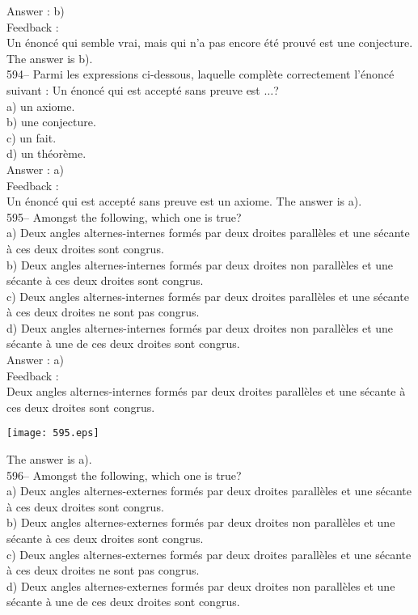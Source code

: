 ﻿\documentclass[letterpaper, 12pt]{article}
\begin{document}
Answer : b)\\

Feedback : \\
Un \'enonc\'e qui semble vrai, mais qui n'a pas encore \'et\'e prouv\'e est
une conjecture.  The answer is b).\\

594-- Parmi les expressions ci-dessous, laquelle compl\`ete
correctement l'\'enonc\'e suivant : \og Un \'enonc\'e qui est
 accept\'e sans preuve est $\ldots$\fg ?\\
a) un axiome.\\
b) une conjecture.\\
c) un fait.\\
d) un th\'eor\`eme.\\

Answer : a)\\

Feedback : \\
Un \'enonc\'e qui est accept\'e sans preuve est un
axiome.  The answer is a).  \\

595-- Amongst the following, which one is true?\\
a) Deux angles alternes-internes form\'es par deux droites parall\`eles et
une s\'ecante \`a ces deux droites sont congrus.\\
b) Deux angles alternes-internes form\'es par deux droites non parall\`eles
et une s\'ecante \`a ces deux droites sont congrus.\\
c) Deux angles alternes-internes form\'es par deux droites parall\`eles et
une s\'ecante \`a ces deux droites ne sont pas congrus.\\
d) Deux angles alternes-internes form\'es par deux droites non parall\`eles
et une s\'ecante \`a une de ces deux droites sont congrus.\\

Answer : a)\\

Feedback : \\
Deux angles alternes-internes form\'es par deux droites parall\`eles
et une s\'ecante \`a ces deux droites sont congrus.   \begin{center}
    \texttt{[image: 595.eps]}
    \end{center}  The answer is a).\\

596-- Amongst the following, which one is true?\\
a) Deux angles alternes-externes form\'es par deux droites parall\`eles et
une s\'ecante \`a ces deux droites sont congrus.\\
b) Deux angles alternes-externes form\'es par deux droites non parall\`eles
et une s\'ecante \`a ces deux droites sont congrus.\\
c) Deux angles alternes-externes form\'es par deux droites parall\`eles et
une s\'ecante \`a ces deux droites ne sont pas congrus.\\
d) Deux angles alternes-externes form\'es par deux droites non parall\`eles
et une s\'ecante \`a une de ces deux droites sont congrus.\\
\end{document}
